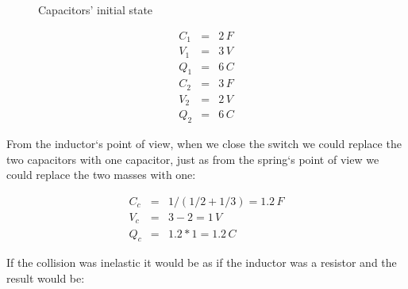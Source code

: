 \begin{figure}[ht] \centering
	\qquad
	\caption{Capacitors' initial state}
\end{figure}

\begin{eqnarray}
C_1 &=& 2 \, F \\
V_1 &=& 3 \, V \\
Q_1 &=& 6 \, C \\
C_2 &=& 3 \, F \\
V_2 &=& 2 \, V \\
Q_2 &=& 6 \, C
\end{eqnarray}

From the inductor`s point of view, when we close the switch we could replace the two capacitors with one capacitor, just as from the spring`s point of view we could replace the two masses with one:

\begin{eqnarray}
C_c &=& 1/(1/2 + 1/3) = 1.2 \, F \\
V_c &=& 3 - 2 = 1 \, V \\
Q_c &=& 1.2 * 1 = 1.2 \, C
\end{eqnarray}

If the collision was inelastic it would be as if the inductor was a resistor and the result would be:

